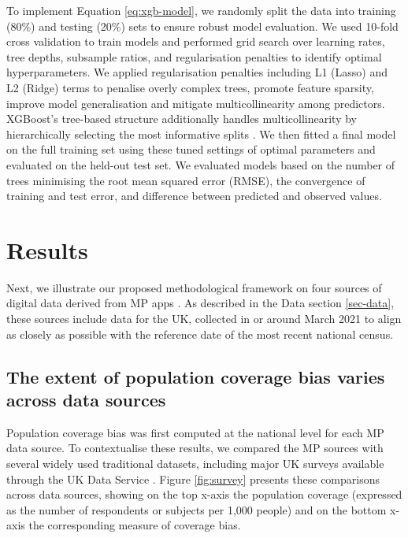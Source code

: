 \documentclass[]{rsos}%
\begin{document}
To implement Equation \ref{eq:xgb-model}, we randomly split the data
into training (80\%) and testing (20\%) sets to ensure robust model
evaluation. We used 10-fold cross validation to train models and
performed grid search over learning rates, tree depths, subsample
ratios, and regularisation penalties to identify optimal
hyperparameters. We applied regularisation penalties including L1
(Lasso) and L2 (Ridge) terms to penalise overly complex trees, promote
feature sparsity, improve model generalisation and mitigate
multicollinearity among predictors. XGBoost's tree-based structure
additionally handles multicollinearity by hierarchically selecting the
most informative splits \citep{chen2016}. We then fitted a final model on the
full training set using these tuned settings of optimal parameters and
evaluated on the held-out test set. We evaluated models based on the
number of trees minimising the root mean squared error (RMSE), the
convergence of training and test error, and difference between predicted
and observed values.

\section{Results}\label{results}

Next, we illustrate our proposed methodological framework on four
sources of digital data derived from MP apps . As
described in the Data section \ref{sec-data}, these sources include
data for the UK, collected in or around March 2021 to align as closely
as possible with the reference date of the most recent national census.

\subsection{The extent of population coverage bias varies across data sources}\label{the-extent-of-population-coverage-bias-varies-across-data-sources}

Population coverage bias was first computed at the national level for
each MP data source. To contextualise these results, we compared the MP
sources with several widely used traditional datasets, including major
UK surveys available through the UK Data Service
\citep{ukdataserviceSurveysData}. Figure \ref{fig:survey} presents these
comparisons across data sources, showing on the top x-axis the
population coverage (expressed as the number of respondents or subjects
per 1,000 people) and on the bottom x-axis the corresponding measure of
coverage bias.
\end{document}
